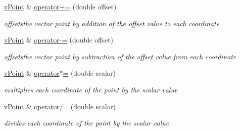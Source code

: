 \begin{DoxyCompactItemize}
\item 
\mbox{\label{classv_point_a9b6165b57297692988ede20a59cd3379}} 
\hyperlink{classv_point}{v\+Point} \& \hyperlink{classv_point_a9b6165b57297692988ede20a59cd3379}{operator+=} (double offset)
\begin{DoxyCompactList}\small\item\em offsetsthe vector point by addition of the offset value to each coordinate \end{DoxyCompactList}\item 
\mbox{\label{classv_point_a2d087a030cd39df3b548e04ea6499c7b}} 
\hyperlink{classv_point}{v\+Point} \& \hyperlink{classv_point_a2d087a030cd39df3b548e04ea6499c7b}{operator-\/=} (double offset)
\begin{DoxyCompactList}\small\item\em offsetsthe vector point by subtraction of the offset value from each coordinate \end{DoxyCompactList}\item 
\mbox{\label{classv_point_a83ce0b6a8451d2aae4af1c84cc5b8abe}} 
\hyperlink{classv_point}{v\+Point} \& \hyperlink{classv_point_a83ce0b6a8451d2aae4af1c84cc5b8abe}{operator$\ast$=} (double scalar)
\begin{DoxyCompactList}\small\item\em multiplies each coordinate of the point by the scalar value \end{DoxyCompactList}\item 
\mbox{\label{classv_point_ac0b1bd4a1f1e0472d1f21ea100c338d6}} 
\hyperlink{classv_point}{v\+Point} \& \hyperlink{classv_point_ac0b1bd4a1f1e0472d1f21ea100c338d6}{operator/=} (double scalar)
\begin{DoxyCompactList}\small\item\em divides each coordinate of the point by the scalar value \end{DoxyCompactList}\end{DoxyCompactItemize}
